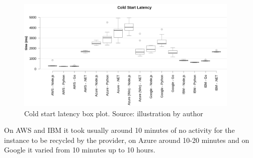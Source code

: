 \begin{figure}[htp]
\begin{center}
\includegraphics[width=0.95\textwidth]{bilder/boxplot_coldstart_all_new.png}
\captionsetup{justification=centering, labelfont=bf}
\caption[Cold start latency box plot]{Cold start latency box plot. Source: illustration by author}
\label{fig:coldstart_plot}
\end{center}
\end{figure}

\newpage
On \gls{AWS} and \gls{IBM} it took usually around 10 minutes of no activity for the instance to be recycled by the provider, on Azure around 10-20 minutes and on Google it varied from 10 minutes up to 10 hours.

